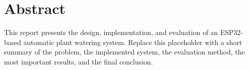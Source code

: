 \chapter*{Abstract}

This report presents the design, implementation, and evaluation of an
ESP32-based automatic plant watering system. Replace this placeholder with a
short summary of the problem, the implemented system, the evaluation method,
the most important results, and the final conclusion.
